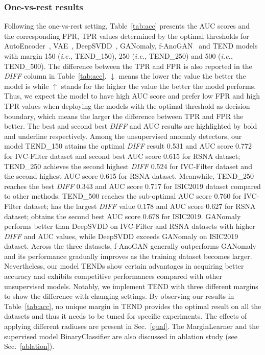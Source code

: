 \documentclass[12pt]{spieman}  %
\begin{document}
\begin{spacing}{2}
\subsubsection{One-vs-rest results}
Following the one-vs-rest setting, Table~\ref{tab:acc} presents the AUC scores and the corresponding FPR, TPR values determined by the optimal thresholds for AutoEncoder~\cite{mcclelland1986parallel}, VAE~\cite{an2015variational:an}, DeepSVDD~\cite{ruff2018deep:ruff}, GANomaly\cite{akcay2018ganomaly:akcay}, f-AnoGAN~\cite{schlegl2019f} and TEND models with margin 150 (\textit{i.e.}, TEND\_150), 250 (\textit{i.e.}, TEND\_250) and 500 (\textit{i.e.}, TEND\_500). The difference between the TPR and FPR is also reported in the \textit{DIFF} column in Table~\ref{tab:acc}. $\downarrow$ means the lower the value the better the model is while $\uparrow$ stands for the higher the value the better the model performs. Thus, we expect the model to have high AUC score and prefer low FPR and high TPR values when deploying the models with the optimal threshold as decision boundary, which means the larger the difference between TPR and FPR the better. The best and 
second best \textit{DIFF} and AUC results are highlighted by bold and underline respectively. {Among the unsupervised anomaly detectors, our model TEND\_150 attains the optimal \textit{DIFF} result 0.531  and AUC score 0.772 for IVC-Filter dataset and second best AUC score 0.615 for RSNA dataset; TEND\_250 achieves the second highest \textit{DIFF} 0.524 for IVC-Filter dataset and the second highest AUC score 0.615 for RSNA dataset. Meanwhile, TEND\_250 reaches the best \textit{DIFF} 0.343 and AUC score 0.717 for ISIC2019 dataset compared to other methods. TEND\_500 reaches the sub-optimal AUC score 0.760 for IVC-Filter dataset; has the largest \textit{DIFF} value 0.178 and AUC score 0.627 for RSNA dataset; obtains the second best AUC score 0.678 for ISIC2019. GANomaly performs better than DeepSVDD on IVC-Filter and RSNA datasets with higher \textit{DIFF} and AUC values, while DeepSVDD exceeds GANomaly on ISIC2019 dataset. Across the three datasets, f-AnoGAN generally outperforms GANomaly and its performance gradually improves as the training dataset becomes larger. Nevertheless, our model TENDs show certain advantages in acquiring better accuracy and exhibits competitive performances compared with other unsupervised models. Notably, we implement TEND with three different margins to show the difference with changing settings. By observing our results in Table~\ref{tab:acc}, no unique margin in TEND provides the optimal result on all the datasets and thus it needs to be tuned for specific experiments. The effects of applying different radiuses are present in Sec.~\ref{qual}. The MarginLearner and the supervised model BinaryClassifier are also discussed in ablation study (see Sec.~\ref{ablation}).}


\end{spacing}
\end{document}
